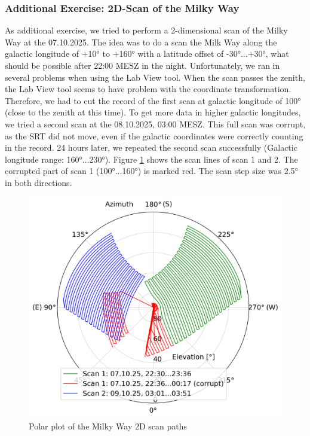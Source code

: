 \pagebreak

\subsubsection{Additional Exercise: 2D-Scan of the Milky Way}\label{sec:MW_2D}
As additional exercise, we tried to perform a 2-dimensional scan of the Milky Way at the 07.10.2025. The idea was to do a scan the Milk Way along the galactic longitude of +10° to +160° with a latitude offset of -30°...+30°, what should be possible after 22:00 MESZ in the night. Unfortunately, we ran in several problems when using the Lab View tool. When the scan passes the zenith, the Lab View tool seems to have problem with the coordinate transformation. Therefore, we had to cut the record of the first scan at galactic longitude of 100° (close to the zenith at this time). To get more data in higher galactic longitudes, we tried a second scan at the 08.10.2025, 03:00 MESZ. This full scan was corrupt, as the SRT did not move, even if the galactic coordinates were correctly counting in the record. 24 hours later, we repeated the second scan successfully (Galactic longitude range: 160°...230°). Figure \ref{fig:mw_2d_polar} shows the scan lines of scan 1 and 2. The corrupted part of scan 1 (100°...160°) is marked red. The scan step size was 2.5° in both directions.

\begin{figure}[H]
    \centering
    \includegraphics[width=12cm]{assets/mw2d_polar_plot.png}
    \caption{Polar plot of the Milky Way 2D scan paths}
    \label{fig:mw_2d_polar}
\end{figure}

